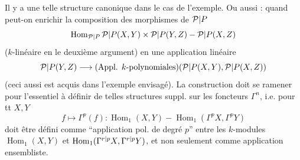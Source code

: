 Il y a une telle structure canonique dans le cas de l'exemple.
Ou aussi : quand peut-on enrichir la composition des morphismes de ${\mathcal P|P}$
\[\operatorname{Hom}_{\mathcal P|P}{\mathcal P|P}(X,Y)\times {\mathcal P|P}(Y,Z)\mathbin{-}{\mathcal P|P}(X,Z)\]
($k$-linéaire en le deuxième argument) en une application linéaire
\[{\mathcal P|P}(Y,Z)\longrightarrow(\text{Appl. }k\text{-polynomiales})({\mathcal P|P}(X,Y),{\mathcal P|P}(X,Z))\]
(ceci aussi est acquis dans l'exemple  envisagé). La construction doit se ramener pour l'essentiel à définir de telles structures suppl. sur les foncteurs $\Gamma^n$, i.e. pour tt $X,Y$
\[f\longmapsto\Gamma^p(f):\operatorname{Hom}_1(X,Y)\mathbin{-}\operatorname{Hom}_1(\Gamma^pX,\Gamma^pY)\]
doit être défini comme ``application pol. de degré $p$'' entre les $k$-modules $\operatorname{Hom}_1(X,Y)$ et $\operatorname{Hom}_1(\Gamma^{{r|p}}X,\Gamma^{{r|p}}Y)$, et non seulement comme application ensembliste.

